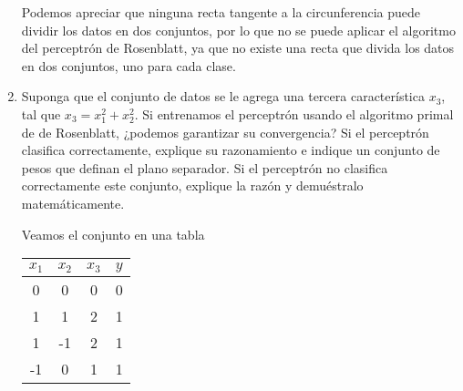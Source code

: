 \documentclass{article}
\theoremstyle{mytheoremstyle}
\theoremstyle{mytheoremstyle}
\theoremstyle{myproblemstyle}
\begin{document}
\begin{enumerate}[label=(\alph*)]
        \begin{center}
        \end{center}

        Podemos apreciar que ninguna recta tangente a la circunferencia puede dividir los datos en dos conjuntos, por lo que no se puede aplicar el algoritmo del perceptrón de Rosenblatt, ya que no existe una recta que divida los datos en dos conjuntos, uno para cada clase.

  \item Suponga que el conjunto de datos se le agrega una tercera característica $x_3$, tal que $x_3=x^2_1+x^2_2$. Si entrenamos el perceptrón usando el algoritmo primal de de Rosenblatt, ¿podemos garantizar su convergencia? Si el perceptrón clasifica correctamente, explique su razonamiento e indique un conjunto de pesos que definan el plano separador. Si el perceptrón no clasifica correctamente este conjunto, explique la razón y demuéstralo matemáticamente.

        Veamos el conjunto en una tabla

        \begin{table}[h]
          \centering
          \begin{tabular}{cccc}
            \hline
            $x_1$ & $x_2$ & $x_3$ & $y$ \\ \hline
            0     & 0     & 0     & 0   \\
            1     & 1     & 2     & 1   \\
            1     & -1    & 2     & 1   \\
            -1    & 0     & 1     & 1   \\ \hline
          \end{tabular}
        \end{table}


\end{enumerate}
\end{document}
